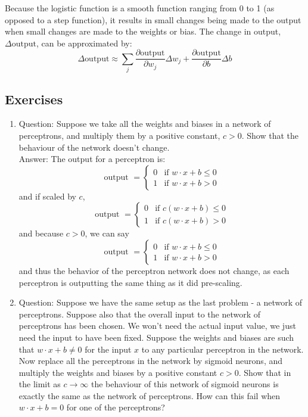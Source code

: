 \documentclass{article}
\begin{document}
Because the logistic function is a smooth function ranging from 0 to 1 (as opposed to a step function), it results in small changes being made to the output when small changes are made to the weights or bias. The change in output, $\Delta \text{output}$,  can be approximated by:
\begin{equation}
\Delta \text{output} \approx \sum_{j} \frac{\partial \text{output}}{\partial w_j} \Delta w_j + \frac{\partial \text{output}}{\partial b} \Delta b
\end{equation}

\subsection{Exercises}
\begin{enumerate}
\item
Question: Suppose we take all the weights and biases in a network of perceptrons, and multiply them by a positive constant, $c>0$. Show that the behaviour of the network doesn't change. \\
Answer: The output for a perceptron is:
\begin{equation*}
\text{output } = \begin{cases} 0 &\mbox{if } w \cdot x + b \leq 0 \\
				          1 &\mbox{if } w \cdot x + b > 0 \end{cases}
\end{equation*}
and if scaled by $c$,
\begin{equation*}
\text{output } = \begin{cases} 0 &\mbox{if } c(w \cdot x + b) \leq 0 \\
				          1 &\mbox{if } c(w \cdot x + b) > 0 \end{cases}
\end{equation*}
and because $c > 0$, we can say
\begin{equation*}
\text{output } = \begin{cases} 0 &\mbox{if } w \cdot x + b \leq 0 \\
				          1 &\mbox{if } w \cdot x + b > 0 \end{cases}
\end{equation*}
and thus the behavior of the perceptron network does not change, as each perceptron is outputting the same thing as it did pre-scaling. \\
\item
Question: Suppose we have the same setup as the last problem - a network of perceptrons. Suppose also that the overall input to the network of perceptrons has been chosen. We won't need the actual input value, we just need the input to have been fixed. Suppose the weights and biases are such that $w\cdot x+b \neq 0$ for the input $x$ to any particular perceptron in the network. Now replace all the perceptrons in the network by sigmoid neurons, and multiply the weights and biases by a positive constant $c>0$. Show that in the limit as $c \rightarrow \infty$ the behaviour of this network of sigmoid neurons is exactly the same as the network of perceptrons. How can this fail when $w\cdot x+b=0$ for one of the perceptrons? \\

\end{enumerate}
\end{document}
